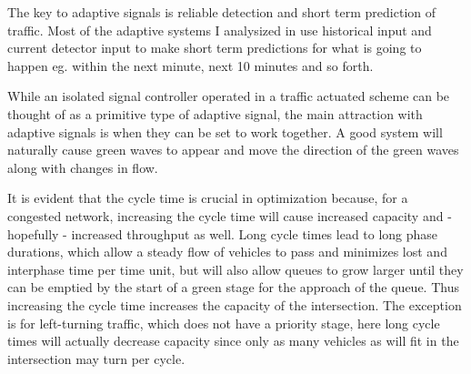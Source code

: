 The key to adaptive signals is reliable detection and short term prediction of traffic. Most of the adaptive systems I analysized in \cite{forprojekt} use historical input and current detector input to make short term predictions for what is going to happen eg. within the next minute, next 10 minutes and so forth.

While an isolated signal controller operated in a traffic actuated scheme can be thought of as a primitive type of adaptive signal, the main attraction with adaptive signals is when they can be set to work together. A good system will naturally cause green waves to appear and move the direction of the green waves along with changes in flow.

It is evident that the cycle time is crucial in optimization because, for a congested network, increasing the cycle time will cause increased capacity and - hopefully - increased throughput as well. Long cycle times lead to long phase durations, which allow a steady flow of vehicles to pass and minimizes lost and interphase time per time unit, but will also allow queues to grow larger until they can be emptied by the start of a green stage for the approach of the queue. Thus increasing the cycle time increases the capacity of the intersection. The exception is for left-turning traffic, which does not have a priority stage, here long cycle times will actually decrease capacity since only as many vehicles as will fit in the intersection may turn per cycle.
